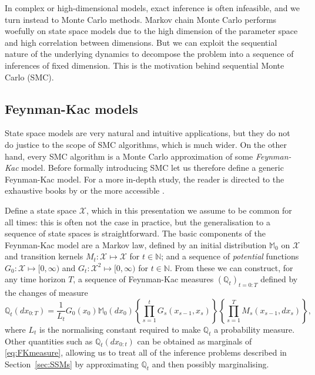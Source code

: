 In complex or high-dimensional models, exact inference is often infeasible, and we turn instead to Monte Carlo methods.
Markov chain Monte Carlo performs woefully on state space models due to the high dimension of the parameter space and high correlation between dimensions. 
But we can exploit the sequential nature of the underlying dynamics to decompose the problem into a sequence of inferences of fixed dimension.
This is the motivation behind sequential Monte Carlo (SMC).


\subsection{Feynman-Kac models}
\label{sec:FKmodels}
State space models are very natural and intuitive applications, but they do not do justice to the scope of SMC algorithms, which is much wider.
On the other hand, 
every SMC algorithm is a Monte Carlo approximation of some \emph{Feynman-Kac} model.
Before formally introducing SMC let us therefore define a generic Feynman-Kac model.
For a more in-depth study, the reader is directed to the exhaustive books by \textcite{delmoral2004, delmoral2013} or the more accessible \textcite[Chapter 5]{chopin2020}.

Define a state space $\mathcal{X}$, which in this presentation we assume to be common for all times: this is often not the case in practice, but the generalisation to a sequence of state spaces is straightforward.
The basic components of the Feynman-Kac model are a Markov law, defined by an initial distribution $\mathbb{M}_0$ on $\mathcal{X}$ and transition kernels $M_t: \mathcal{X} \mapsto \mathcal{X}$ for $t\in\mathbb{N}$; and a sequence of \emph{potential} functions $G_0 : \mathcal{X} \mapsto [0,\infty)$  and $G_t : \mathcal{X}^2 \mapsto [0,\infty)$ for $t\in\mathbb{N}$.
From these we can construct, for any time horizon $T$, a sequence of Feynman-Kac measures $(\mathbb{Q}_t)_{t=0:T}$ defined by the changes of measure
\begin{equation}
\mathbb{Q}_t (dx_{0:T}) = \frac{1}{L_t} G_0(x_0) \mathbb{M}_0(dx_0)
        \left\{ \prod_{s=1}^t G_s(x_{s-1}, x_s) \right\} 
        \left\{ \prod_{s=1}^T M_s(x_{s-1}, dx_s) \right\} , \label{eq:FKmeasure}
\end{equation}
where $L_t$ is the normalising constant required to make $\mathbb{Q}_t$ a probability measure. Other quantities such as $\mathbb{Q}_t (dx_{0:t})$ can be obtained as marginals of \eqref{eq:FKmeasure}, allowing us to treat all of the inference problems described in Section~\ref{sec:SSMs} by approximating $\mathbb{Q}_t$ and then possibly marginalising.


